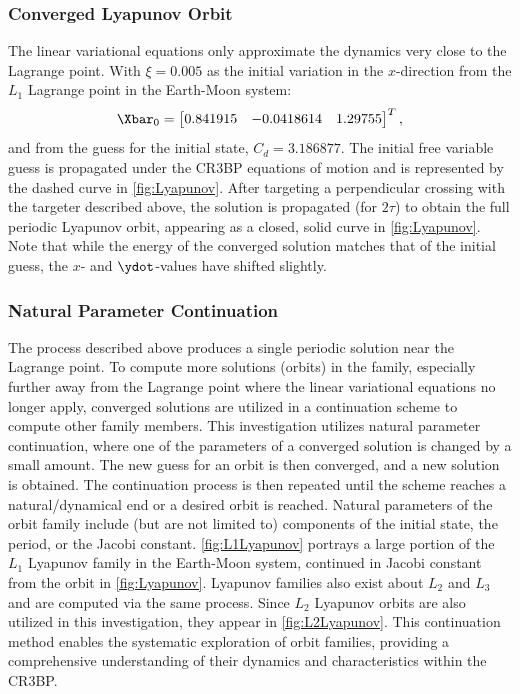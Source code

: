 \subsubsection{Converged Lyapunov Orbit}
The linear variational equations only approximate the dynamics very close to the Lagrange point.
With $\xi=0.005$ as the initial variation in the $x$-direction from the $L_{1}$ Lagrange point in
the Earth-Moon system:
\begin{equation}
    \Xbar_{0}=\begin{bmatrix}   0.841915    &   -0.0418614  &   1.29755\end{bmatrix}^{T},
    \label{eq:Lyapunovguess}
\end{equation}
and from the guess for the initial state, $C_{d}=3.186877$. The initial free variable guess is
propagated under the CR3BP equations of motion and is represented by the dashed curve in
\cref{fig:Lyapunov}. After targeting a perpendicular crossing with the targeter described above,
the solution is propagated (for $2\tau$) to obtain the full periodic Lyapunov orbit, appearing as a
closed, solid curve in \cref{fig:Lyapunov}. Note that while the energy of the converged solution
matches that of the initial guess, the $x$- and $\ydot$-values have shifted slightly.

\subsubsection{Natural Parameter Continuation}
The process described above produces a single periodic solution near the Lagrange point. To compute
more solutions (orbits) in the family, especially further away from the Lagrange point where the linear
variational equations no longer apply, converged solutions are utilized in a continuation scheme to
compute other family members. This investigation utilizes natural parameter continuation, where one
of the parameters of a converged solution is changed by a small amount. The new guess for an orbit
is then converged, and a new solution is obtained. The continuation process is then repeated until
the scheme reaches a natural/dynamical end or a desired orbit is reached. Natural parameters of the
orbit family include (but are not limited to) components of the initial state, the period, or the
Jacobi constant. \cref{fig:L1Lyapunov} portrays a large portion of the $L_{1}$ Lyapunov family in
the Earth-Moon system, continued in Jacobi constant from the orbit in \cref{fig:Lyapunov}. Lyapunov
families also exist about $L_{2}$ and $L_{3}$ and are computed via the same process. Since $L_{2}$
Lyapunov orbits are also utilized in this investigation, they appear in \cref{fig:L2Lyapunov}. This
continuation method enables the systematic exploration of orbit families, providing a comprehensive
understanding of their dynamics and characteristics within the CR3BP.
\vspace{25mm}

